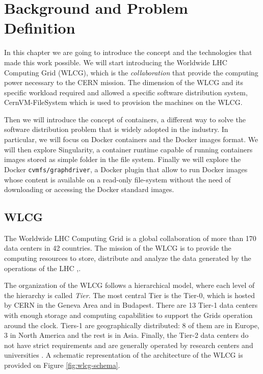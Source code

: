 \chapter{Background and Problem Definition}\label{ch:background}

In this chapter we are going to introduce the concept and the technologies that
made this work possible.  We will start introducing the Worldwide LHC Computing
Grid (WLCG), which is the \textit{collaboration} that provide the computing power
necessary to the CERN mission. The dimension of the WLCG and its specific
workload required and allowed a specific software distribution system,
CernVM-FileSystem which is used to provision the machines on the WLCG.

Then we will introduce the concept of containers, a different way to solve the
software distribution problem that is widely adopted in the industry. In
particular, we will focus on Docker containers and the Docker images format. We
will then explore Singularity, a container runtime capable of running
containers images stored as simple folder in the file system. Finally we will
explore the Docker \texttt{cvmfs/graphdriver}, a Docker plugin that allow to
run Docker images whose content is available on a read-only file-system without
the need of downloading or accessing the Docker standard images.


\section{WLCG}

The Worldwide LHC Computing Grid is a global collaboration of more than 170
data centers in 42 countries.  The mission of the WLCG is to provide the
computing resources to store, distribute and analyze the data generated by the
operations of the LHC \cite{grid:website},\cite{grid:report}.

The organization of the WLCG follows a hierarchical model, where each level of
the hierarchy is called \textit{Tier}. The most central Tier is the Tier-0,
which is hosted by CERN in the Geneva Area and in Budapest. There are 13 Tier-1
data centers with enough storage and computing capabilities to support the
Grids operation around the clock.  Tiers-1 are geographically distributed: 8 of
them are in Europe, 3 in North America and the rest is in Asia. Finally, the
Tier-2 data centers do not have strict requirements and are generally operated
by research centers and universities \cite{grid:report}.  A schematic
representation of the architecture of the WLCG is provided on Figure
\ref{fig:wlcg-schema}.



